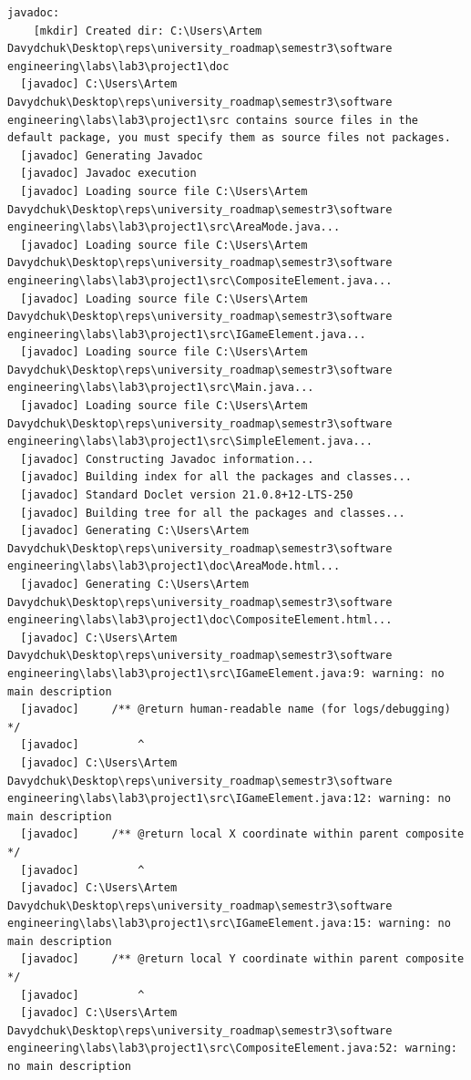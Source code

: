 \documentclass[12pt,a4paper]{article}
\begin{document}
\begin{verbatim}
javadoc:
    [mkdir] Created dir: C:\Users\Artem Davydchuk\Desktop\reps\university_roadmap\semestr3\software engineering\labs\lab3\project1\doc
  [javadoc] C:\Users\Artem Davydchuk\Desktop\reps\university_roadmap\semestr3\software engineering\labs\lab3\project1\src contains source files in the default package, you must specify them as source files not packages.
  [javadoc] Generating Javadoc
  [javadoc] Javadoc execution
  [javadoc] Loading source file C:\Users\Artem Davydchuk\Desktop\reps\university_roadmap\semestr3\software engineering\labs\lab3\project1\src\AreaMode.java...
  [javadoc] Loading source file C:\Users\Artem Davydchuk\Desktop\reps\university_roadmap\semestr3\software engineering\labs\lab3\project1\src\CompositeElement.java...
  [javadoc] Loading source file C:\Users\Artem Davydchuk\Desktop\reps\university_roadmap\semestr3\software engineering\labs\lab3\project1\src\IGameElement.java...
  [javadoc] Loading source file C:\Users\Artem Davydchuk\Desktop\reps\university_roadmap\semestr3\software engineering\labs\lab3\project1\src\Main.java...
  [javadoc] Loading source file C:\Users\Artem Davydchuk\Desktop\reps\university_roadmap\semestr3\software engineering\labs\lab3\project1\src\SimpleElement.java...
  [javadoc] Constructing Javadoc information...
  [javadoc] Building index for all the packages and classes...
  [javadoc] Standard Doclet version 21.0.8+12-LTS-250
  [javadoc] Building tree for all the packages and classes...
  [javadoc] Generating C:\Users\Artem Davydchuk\Desktop\reps\university_roadmap\semestr3\software engineering\labs\lab3\project1\doc\AreaMode.html...
  [javadoc] Generating C:\Users\Artem Davydchuk\Desktop\reps\university_roadmap\semestr3\software engineering\labs\lab3\project1\doc\CompositeElement.html...
  [javadoc] C:\Users\Artem Davydchuk\Desktop\reps\university_roadmap\semestr3\software engineering\labs\lab3\project1\src\IGameElement.java:9: warning: no main description
  [javadoc]     /** @return human-readable name (for logs/debugging) */
  [javadoc]         ^
  [javadoc] C:\Users\Artem Davydchuk\Desktop\reps\university_roadmap\semestr3\software engineering\labs\lab3\project1\src\IGameElement.java:12: warning: no main description
  [javadoc]     /** @return local X coordinate within parent composite */
  [javadoc]         ^
  [javadoc] C:\Users\Artem Davydchuk\Desktop\reps\university_roadmap\semestr3\software engineering\labs\lab3\project1\src\IGameElement.java:15: warning: no main description
  [javadoc]     /** @return local Y coordinate within parent composite */
  [javadoc]         ^
  [javadoc] C:\Users\Artem Davydchuk\Desktop\reps\university_roadmap\semestr3\software engineering\labs\lab3\project1\src\CompositeElement.java:52: warning: no main description

\end{verbatim}
\end{document}
